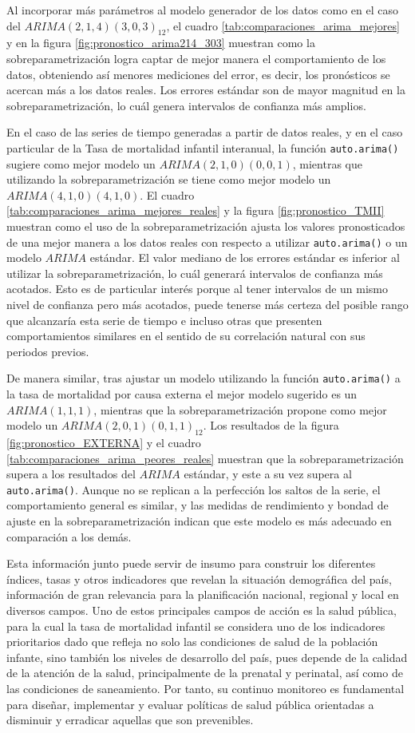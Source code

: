 \documentclass[
]{article}
\begin{document}
Al incorporar más parámetros al modelo generador de los datos como en el
caso del \(ARIMA(2,1,4)(3,0,3)_{12}\), el cuadro
\ref{tab:comparaciones_arima_mejores} y en la figura
\ref{fig:pronostico_arima214_303} muestran como la sobreparametrización
logra captar de mejor manera el comportamiento de los datos, obteniendo
así menores mediciones del error, es decir, los pronósticos se acercan
más a los datos reales. Los errores estándar son de mayor magnitud en la
sobreparametrización, lo cuál genera intervalos de confianza más
amplios.

En el caso de las series de tiempo generadas a partir de datos reales, y
en el caso particular de la Tasa de mortalidad infantil interanual, la
función \texttt{auto.arima()} sugiere como mejor modelo un
\(ARIMA(2,1,0)(0,0,1)\), mientras que utilizando la sobreparametrización
se tiene como mejor modelo un \(ARIMA(4,1,0)(4,1,0)\). El cuadro
\ref{tab:comparaciones_arima_mejores_reales} y la figura
\ref{fig:pronostico_TMII} muestran como el uso de la
sobreparametrización ajusta los valores pronosticados de una mejor
manera a los datos reales con respecto a utilizar \texttt{auto.arima()}
o un modelo \(ARIMA\) estándar. El valor mediano de los errores estándar
es inferior al utilizar la sobreparametrización, lo cuál generará
intervalos de confianza más acotados. Esto es de particular interés
porque al tener intervalos de un mismo nivel de confianza pero más
acotados, puede tenerse más certeza del posible rango que alcanzaría
esta serie de tiempo e incluso otras que presenten comportamientos
similares en el sentido de su correlación natural con sus periodos
previos.

De manera similar, tras ajustar un modelo utilizando la función
\texttt{auto.arima()} a la tasa de mortalidad por causa externa el mejor
modelo sugerido es un \(ARIMA(1,1,1)\), mientras que la
sobreparametrización propone como mejor modelo un
\(ARIMA(2,0,1)(0,1,1)_{12}\). Los resultados de la figura
\ref{fig:pronostico_EXTERNA} y el cuadro
\ref{tab:comparaciones_arima_peores_reales} muestran que la
sobreparametrización supera a los resultados del \(ARIMA\) estándar, y
este a su vez supera al \texttt{auto.arima()}. Aunque no se replican a
la perfección los saltos de la serie, el comportamiento general es
similar, y las medidas de rendimiento y bondad de ajuste en la
sobreparametrización indican que este modelo es más adecuado en
comparación a los demás.

Esta información junto puede servir de insumo para construir los
diferentes índices, tasas y otros indicadores que revelan la situación
demográfica del país, información de gran relevancia para la
planificación nacional, regional y local en diversos campos. Uno de
estos principales campos de acción es la salud pública, para la cual la
tasa de mortalidad infantil se considera uno de los indicadores
prioritarios dado que refleja no solo las condiciones de salud de la
población infante, sino también los niveles de desarrollo del país, pues
depende de la calidad de la atención de la salud, principalmente de la
prenatal y perinatal, así como de las condiciones de saneamiento. Por
tanto, su continuo monitoreo es fundamental para diseñar, implementar y
evaluar políticas de salud pública orientadas a disminuir y erradicar
aquellas que son prevenibles.
\end{document}
